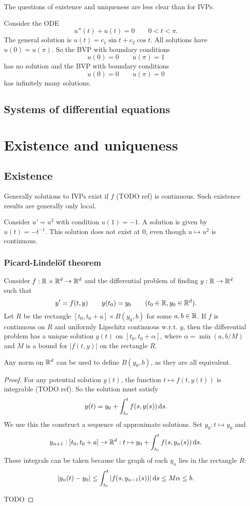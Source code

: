 The questions of existence and uniqueness are less clear than for IVPs.
\begin{example}
Consider the ODE
\[ u''(t) + u(t) = 0 \qquad 0<t<\pi. \]
The general solution is $u(t) = c_1\sin t + c_2 \cos t$. All solutions have $u(0) = u(\pi)$.
So the BVP with boundary conditions
\[ u(0) = 0 \qquad u(\pi) = 1 \]
has no solution and the BVP with boundary conditions
\[ u(0) = 0 \qquad u(\pi) = 0 \]
has infinitely many solutions.
\end{example}


\subsection{Systems of differential equations}

\section{Existence and uniqueness}
\subsection{Existence}
Generally solutions to IVPs exist if $f$ (TODO ref) is continuous. Such existence results are generally only local.

\begin{example}
Consider $u' = u^2$ with condition $u(1) = -1$. A solution is given by $u(t) = -t^{-1}$. This solution does not exist at $0$, even though $u\mapsto u^2$ is continuous.
\end{example}

\subsubsection{Picard-Lindelöf theorem}
\begin{theorem}
Consider $f: \mathbb{R}\times \mathbb{R}^d \to \mathbb{R}^d$ and the differential problem of finding $y:\mathbb{R}\to \mathbb{R}^d$ such that
\[ y' = f(t,y) \qquad y(t_0) = y_0 \qquad (t_0\in \mathbb{R}, y_0\in\mathbb{R}^d). \]
Let $R$ be the rectangle $[t_0,t_0+a]\times B(y_0, b)$ for some $a,b\in \mathbb{R}$.
If $f$ is continuous on $R$  and uniformly Lipschitz continuous w.r.t. $y$, then the differential problem has a unique solution $y(t)$ on $[t_0,t_0+\alpha]$, where $\alpha = \min(a,b/M)$ and $M$ is a bound for $|f(t,y)|$ on the rectangle $R$.
\end{theorem}
Any norm on $\mathbb{R}^d$ can be used to define $B(y_0, b)$, as they are all equivalent.
\begin{proof}
For any potential solution $y(t)$, the function $t\mapsto f(t,y(t))$ is integrable (TODO ref). So the solution must satisfy \[ y(t) = y_0 + \int_{t_0}^tf(s, y(s))\operatorname{d \!}{s}. \]
We use this the construct a sequence of approximate solutions. Set $y_0: t\mapsto y_0$ and
\[ y_{n+1}: [t_0, t_0+a] \to \mathbb{R}^d: t\mapsto y_0 + \int_{t_0}^t f(s,y_n(s))\operatorname{d \!}{s}. \]
These integrals can be taken because the graph of each $y_n$ lies in the rectangle $R$:
\[ |y_n(t) - y_0| \leq \int_{t_0}^t|f(s,y_{n-1}(s))|\operatorname{d \!}{s} \leq M\alpha \leq b. \]

TODO
\end{proof}

